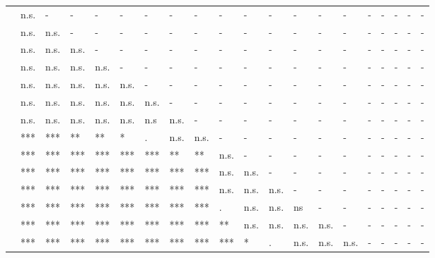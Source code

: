 \documentclass[11pt,fleqn]{article}
\newcommand{\6}{\mbox{$[\hspace*{-.6mm}[$}}
\newcommand{\9}{\mbox{$]\hspace*{-.6mm}]$}}
\begin{document}
\begin{table}[H]
\begin{tabular}{l l l l l l l l l l l l l l l l l l l l }
\midrule
\color{blue}{\em be right}\color{black}		& n.s. & - & - & - & - & - & - & - & - & - & - & - & - & - & - & - & - & - & - \\
\color{brown}{\em suggest}\color{black}			& n.s. & n.s. & - & - & - & - & - & - & - & - & - & - & - & - & - & - & - & - & - \\
\color{brown}{\em say}	\color{black}		& n.s. & n.s. & n.s. & - & - & - & - & - & - & - & - & - & - & - & - & - & - & - & - \\
\color{black}{\em prove}\color{black}		& n.s. & n.s. & n.s. & n.s. & - & - & - & - & - & - & - & - & - & - & - & - & - & - & - \\
\color{brown}{\em think}\color{black}		& n.s. & n.s. & n.s. & n.s. & n.s. & - & - & - & - & - & - & - & - & - & - & - & - & - & - \\
\color{black}{\em confirm}\color{black}		& n.s. & n.s. & n.s. & n.s. & n.s. & n.s. & - & - & - & - & - & - & - & - & - & - & - & - & - \\
\color{blue}{\em establish}\color{black}		& n.s. & n.s. & n.s. & n.s. & n.s. & n.s & n.s. & - & - & - & - & - & - & - & - & - & - & - & - \\
\color{black}{\em demonstrate}\color{black}		& *** & *** & ** & ** & * & . & n.s. & n.s. & - & - & - & - & - & - & - & - & - & - & - \\
\color{black}{\em announce}\color{black}		& *** & *** & *** & *** & *** & *** & ** & ** & n.s. & - & - & - & - & - & - & - & - & - & - \\
\color{black}{\em confess}\color{black}	& *** & *** & *** & *** & *** & *** & *** & *** & n.s. & n.s. & - & - & - & - & - & - & - & - & - \\
\color{blue}{\em reveal}\color{black}			& *** & *** & *** & *** & *** & *** & *** & *** & n.s. & n.s. & n.s. & - & - & - & - & - & - & - & - \\
\color{black}{\em admit}\color{black}		& *** & *** & *** & *** & *** & *** & *** & *** & . & n.s. & n.s. &  ns & - & - & - & - & - & - & - \\
\color{black}{\em acknowledge}\color{black}	& *** & *** & *** & *** & *** & *** & *** & *** & ** & n.s. & n.s. & n.s. & n.s. & - & - & - & - & - & - \\
\color{blue}{\em discover}\color{black}		& *** & *** & *** & *** & *** & *** & *** & *** & *** & * & . & n.s. & n.s. & n.s. & - & - & - & - & - \\

\end{tabular}
\end{table}
\end{document}
